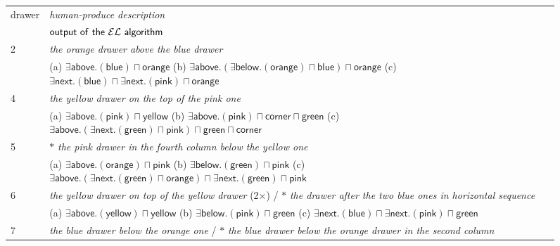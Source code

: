 \begin{figure}[thb]

\begin{small}
\begin{tabular}{|lp{}|}\hline
\multirow{2}{*}{drawer} & \textit{human-produce description} \\
& $\mathsf{output\ of\ the\ \el\ algorithm}$\\\hline
2 & \textit{the orange drawer above the blue drawer} \\
& (a) $\exists \mathsf{above}.(\mathsf{blue}) \sqcap \mathsf{orange}$ (b) $\exists \mathsf{above}.(\exists \mathsf{below}.(\mathsf{orange}) \sqcap \mathsf{blue}) \sqcap \mathsf{orange}$ (c) $\exists \mathsf{next}.(\mathsf{blue}) \sqcap \exists \mathsf{next}.(\mathsf{pink}) \sqcap \mathsf{orange}$\\
4 & \textit{the yellow drawer on the top of the pink one} \\ 
& (a) $\exists \mathsf{above}.(\mathsf{pink}) \sqcap \mathsf{yellow}$  (b) $\exists \mathsf{above}.(\mathsf{pink}) \sqcap \mathsf{corner} \sqcap \mathsf{green}$  (c) $\exists \mathsf{above}.(\exists \mathsf{next}.(\mathsf{green}) \sqcap \mathsf{pink}) \sqcap \mathsf{green} \sqcap \mathsf{corner}$\\
5 & $\ast$ \textit{the pink drawer in the fourth column below the yellow one}\\
& (a) $\exists \mathsf{above}.(\mathsf{orange}) \sqcap \mathsf{pink}$  (b) $\exists \mathsf{below}.(\mathsf{green}) \sqcap \mathsf{pink}$  (c) $\exists \mathsf{above}.(\exists \mathsf{next}.(\mathsf{green}) \sqcap \mathsf{orange}) \sqcap \exists \mathsf{next}.(\mathsf{green}) \sqcap \mathsf{pink}$\\
6 & \textit{the yellow drawer on top of the yellow drawer} (2$\times$) / $\ast$ \textit{the drawer after the two blue ones in horizontal sequence}\\
& (a) $\exists \mathsf{above}.(\mathsf{yellow}) \sqcap \mathsf{yellow}$  (b) $\exists \mathsf{below}.(\mathsf{pink}) \sqcap \mathsf{green}$  (c) $\exists \mathsf{next}.(\mathsf{blue}) \sqcap \exists \mathsf{next}.(\mathsf{pink}) \sqcap \mathsf{green}$\\
7 & \textit{the blue drawer below the orange one} / $\ast$ \textit{the blue drawer below the orange drawer in the second column}\\ 

\end{tabular}
\end{small}
\end{figure}
